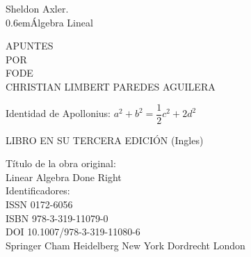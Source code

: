 \begin{titlingpage}

\newcommand\nbvspace[1][3]{\vspace*{\stretch{#1}}}
\newcommand\nbstretchyspace{\spaceskip0.5em plus 0.25em minus 0.25em}
\newcommand{\nbtitlestretch}{\spaceskip0.6em}
\pagestyle{empty}

\begin{center}
\bfseries
\nbvspace[1]

\Large Sheldon Axler.\\
\Huge
{\nbtitlestretch\Huge Álgebra Lineal}\\
\vspace{.5cm}
\large
\nbvspace[1]

APUNTES\\

\nbvspace[1]
\small POR\\
\Large FODE\\[0.5em]
\footnotesize CHRISTIAN LIMBERT PAREDES AGUILERA\\

\nbvspace[2]

Identidad de Apollonius: $a^2+b^2=\dfrac{1}{2}c^2+2d^2$

\begin{center}
\end{center}

\nbvspace[3]
\normalsize

LIBRO EN SU TERCERA EDICIÓN (Ingles)\\
\large
\nbvspace[1]

\end{center}

\break
\bfseries 

\nbvspace[1]
Título de la obra original:\\
Linear Algebra Done Right\\
Identificadores: \\
ISSN 0172-6056\\
ISBN 978-3-319-11079-0\\
DOI 10.1007/978-3-319-11080-6\\
Springer Cham Heidelberg New York Dordrecht London\\



\end{titlingpage}
